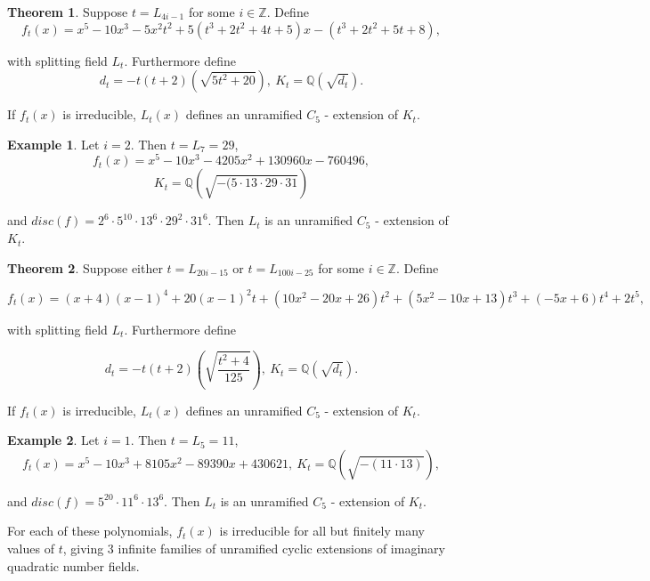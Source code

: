 \documentclass[12pt]{extarticle}
\newcommand{\Q}{\mathbb{Q}}
\newcommand{\Z}{\mathbb{Z}}
\newcommand{\<}{\langle}
\renewcommand{\>}{\rangle}
\theoremstyle{definition}
\newtheorem{theorem}{Theorem}
\newtheorem{example}{Example}
\begin{document}
\begin{theorem}
Suppose $t = L_{4i-1}$ for some $i \in \Z$. Define 
\begin{equation}
f_t(x) = x^5 -10x^3 - 5x^2t^2+5(t^3+2t^2+4t+5)x-(t^3+2t^2+5t+8),
\end{equation}




   with splitting field $L_t$.  
Furthermore define 
\begin{equation}
d_t = -t(t+2)(\sqrt{5t^2+20}), \: K_t = \Q(\sqrt{d_t}).
\end{equation}



If $f_t(x)$ is irreducible, $L_t(x)$ defines an unramified $C_5$ - extension of $K_t$.
\end{theorem}
\begin{example}
Let $i=2$. Then $t=L_{7} = 29$,
\begin{equation}
f_t(x) = x^5 - 10x^3 - 4205x^2 + 130960x - 760496,
\end{equation}
\begin{equation}
 K_t = \Q\left(\sqrt{-( 5 \cdot 13 \cdot 29 \cdot 31}\right)
\end{equation}

and $disc(f) =2^6 \cdot 5^{10} \cdot 13^6 \cdot 29^2 \cdot 31^6$. Then $L_t$ is an unramified $C_5$ - extension of $K_t$. 
\end{example}
\begin{theorem}
Suppose either $t = L_{20i-15}$ or $t = L_{100i-25}$ for some $i \in \Z$. Define 

\begin{equation}
f_t(x) = (x+4)(x-1)^4 + 20(x-1)^2t + (10x^2-20x+26)t^2 + (5x^2-10x+13)t^3 +(-5x+6)t^4 + 2t^5,
\end{equation}


 with splitting field $L_t$. 
 Furthermore define 

\begin{equation}
d_t = -t(t+2)\left(\sqrt{\frac{t^2+4}{125}}\right), \: K_t = \Q(\sqrt{d_t}).
\end{equation}


  If $f_t(x)$ is irreducible, $L_t(x)$ defines an unramified $C_5$ - extension of $K_t$. 
\end{theorem}

\begin{example}
Let $i=1$. Then $t=L_{5} = 11$, 
\begin{equation}
f_t(x) = x^5 - 10x^3 + 8105x^2 - 89390x + 430621,\:K_t = \Q \left(\sqrt{-( 11 \cdot13)}\right),
\end{equation}


 and $disc(f) =5^{20} \cdot 11^6 \cdot 13^6
$. Then $L_t$ is an unramified $C_5$ - extension of $K_t$. 
\end{example}
For each of these polynomials, $f_t(x)$ is irreducible for all but finitely many values of $t$, giving 3 infinite families of unramified cyclic extensions of imaginary quadratic number fields. 
\end{document}
